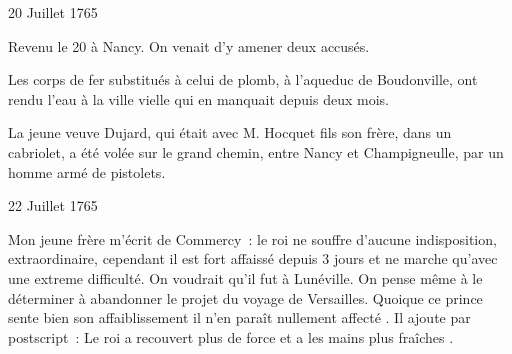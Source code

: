                      \begin{diary}{20 Juillet 1765}{}
                        
                         Revenu le
                              20 à Nancy. On venait
                           d'y
                           amener deux accusés. \bigskip
        
        
                         Les corps de fer substitués à celui de
                           plomb,
                           à l'aqueduc de
                              Boudonville, ont rendu l'eau
                           à la ville vielle qui en
                           manquait depuis
                           deux mois. \bigskip
        
        
                        
                           La jeune veuve Dujard, qui
                           était avec M.
                              Hocquet fils son frère, dans un cabriolet,
                           a été volée sur le grand chemin, entre
                           Nancy et Champigneulle, par un homme
                           armé de pistolets. \bigskip
        
        
                     \end{diary}

                     \begin{diary}{22 Juillet 1765}{}
                        
                        
                           Mon jeune frère m'écrit
                           de Commercy :
                           \og le roi ne souffre
                              d'aucune indisposition,
                              extraordinaire, cependant il est fort affaissé
                              depuis 3 jours et ne marche qu'avec
                              une extreme difficulté. On voudrait qu'il
                              fut à Lunéville. On
                              pense même à le
                              déterminer à abandonner le projet du
                              voyage de Versailles.
                              Quoique ce prince
                              sente bien son affaiblissement il n'en
                              paraît nullement affecté  \fg{}. Il ajoute par postscript : \og Le roi a recouvert plus de
                              force et a les mains plus fraîches \fg{}. \bigskip
        
        
                     \end{diary}

